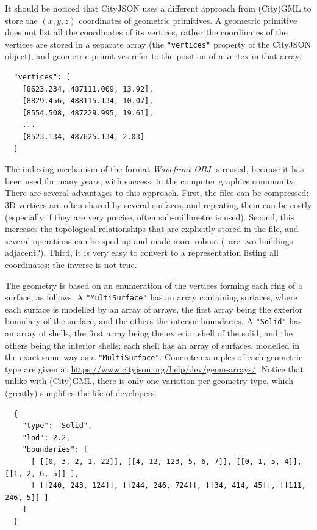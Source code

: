It should be noticed that CityJSON uses a different approach from (City)GML to store the $(x,y,z)$ coordinates of geometric primitives.
A geometric primitive does not list all the coordinates of its vertices, rather the coordinates of the vertices are stored in a separate array (the \texttt{"vertices"} property of the CityJSON object), and geometric primitives refer to the position of a vertex in that array.
\begin{lstlisting}
  "vertices": [
    [8623.234, 487111.009, 13.92],
    [8829.456, 488115.134, 10.07],
    [8554.508, 487229.995, 19.61],
    ...
    [8523.134, 487625.134, 2.03]
  ]
\end{lstlisting}
The indexing mechanism of the format \emph{Wavefront OBJ} is reused, because it has been used for many years, with success, in the computer graphics community.
There are several advantages to this approach.
First, the files can be compressed: 3D vertices are often shared by several surfaces, and repeating them can be costly (especially if they are very precise, often sub-millimetre is used).
Second, this increases the topological relationships that are explicitly stored in the file, and several operations can be sped up and made more robust (\eg\ are two buildings adjacent?).
Third, it is very easy to convert to a representation listing all coordinates; the inverse is not true. 

%

The geometry is based on an enumeration of the vertices forming each ring of a surface, as follows.
A \texttt{"MultiSurface"} has an array containing surfaces, where each surface is modelled by an array of arrays, the first array being the exterior boundary of the surface, and the others the interior boundaries.
A \texttt{"Solid"} has an array of shells, the first array being the exterior shell of the solid, and the others being the interior shells; each shell has an array of surfaces, modelled in the exact same way as a \texttt{"MultiSurface"}.
Concrete examples of each geometric type are given at \url{https://www.cityjson.org/help/dev/geom-arrays/}.
Notice that unlike with (City)GML, there is only one variation per geometry type, which (greatly) simplifies the life of developers.
\begin{lstlisting}
  {
    "type": "Solid",
    "lod": 2.2,
    "boundaries": [
      [ [[0, 3, 2, 1, 22]], [[4, 12, 123, 5, 6, 7]], [[0, 1, 5, 4]], [[1, 2, 6, 5]] ], 
      [ [[240, 243, 124]], [[244, 246, 724]], [[34, 414, 45]], [[111, 246, 5]] ] 
    ]
  }
\end{lstlisting}


